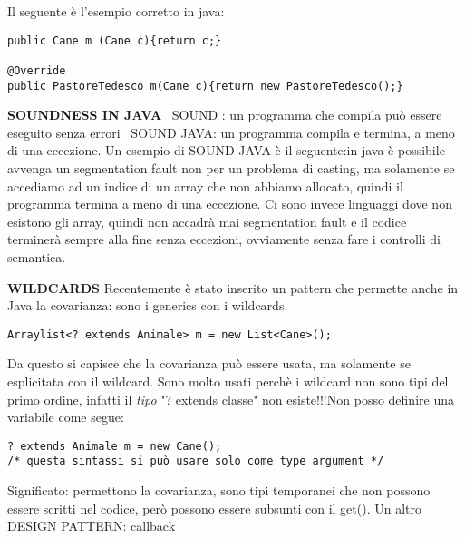 \noindent Il seguente è l'esempio corretto in java:
\begin{lstlisting}
public Cane m (Cane c){return c;}

@Override
public PastoreTedesco m(Cane c){return new PastoreTedesco();}
\end{lstlisting}

\noindent \textbf{SOUNDNESS IN JAVA} \newline
\textbullet\ SOUND : un programma che compila può essere eseguito senza errori \newline
\textbullet\ SOUND JAVA: un programma compila e termina, a meno di una eccezione. \newline
Un esempio di SOUND JAVA è il seguente:in java è possibile avvenga un segmentation fault non per un problema di casting, ma solamente se accediamo ad un indice di un array che non abbiamo allocato, quindi il programma termina a meno di una eccezione. Ci sono invece linguaggi dove non esistono gli array, quindi non accadrà mai segmentation fault e il codice terminerà sempre alla fine senza eccezioni, ovviamente senza fare i controlli di semantica. 

\noindent \textbf{WILDCARDS} \newline
\noindent Recentemente è stato inserito un pattern che permette anche in Java la covarianza: sono i generics con i wildcards. 
\begin{lstlisting}
Arraylist<? extends Animale> m = new List<Cane>();
\end{lstlisting}
\noindent Da questo si capisce che la covarianza può essere usata, ma solamente se esplicitata con il wildcard. \newline
Sono molto usati perchè i wildcard non sono tipi del primo ordine, infatti il \textit{tipo} "? extends classe" non esiste!!!Non posso definire una variabile come segue: 
\begin{lstlisting}
? extends Animale m = new Cane();
/* questa sintassi si può usare solo come type argument */
\end{lstlisting}
Significato: permettono la covarianza, sono tipi temporanei che non possono essere scritti nel codice, però possono essere subsunti con il get(). \newline
Un altro DESIGN PATTERN: callback














